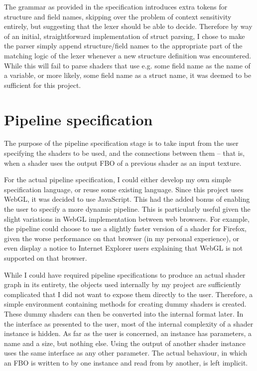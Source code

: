 \documentclass[12pt,twoside,notitlepage]{report}
\begin{document}
The grammar as provided in the specification introduces extra tokens for structure and field names, skipping over the problem of context sensitivity entirely, but suggesting that the lexer should be able to decide. Therefore by way of an initial, straightforward implementation of struct parsing, I chose to make the parser simply append structure/field names to the appropriate part of the matching logic of the lexer whenever a new structure definition was encountered. While this will fail to parse shaders that use e.g. some field name as the name of a variable, or more likely, some field name as a struct name, it was deemed to be sufficient for this project.

\section{Pipeline specification}
The purpose of the pipeline specification stage is to take input from the user specifying the shaders to be used, and the connections between them -- that is, when a shader uses the output FBO of a previous shader as an input texture.

For the actual pipeline specification, I could either develop my own simple specification language, or reuse some existing language. Since this project uses WebGL, it was decided to use JavaScript. This had the added bonus of enabling the user to specify a more dynamic pipeline. This is particularly useful given the slight variations in WebGL implementation between web browsers. For example, the pipeline could choose to use a slightly faster version of a shader for Firefox, given the worse performance on that browser (in my personal experience), or even display a notice to Internet Explorer users explaining that WebGL is not supported on that browser.

While I could have required pipeline specifications to produce an actual shader graph in its entirety, the objects used internally by my project are sufficiently complicated that I did not want to expose them directly to the user. Therefore, a simple environment containing methods for creating dummy shaders is created. These dummy shaders can then be converted into the internal format later. In the interface as presented to the user, most of the internal complexity of a shader instance is hidden. As far as the user is concerned, an instance has parameters, a name and a size, but nothing else. Using the output of another shader instance uses the same interface as any other parameter. The actual behaviour, in which an FBO is written to by one instance and read from by another, is left implicit.
\end{document}
